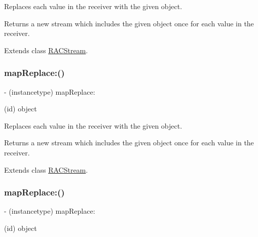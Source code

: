 Replaces each value in the receiver with the given object.

Returns a new stream which includes the given object once for each value in the receiver. 

Extends class \mbox{\hyperlink{interface_r_a_c_stream_a9e55da434f4cf84e14f9133ac48383b8}{R\+A\+C\+Stream}}.

\mbox{\label{category_r_a_c_stream_07_operations_08_a9e55da434f4cf84e14f9133ac48383b8}} 
\subsubsection{\texorpdfstring{map\+Replace\+:()}{mapReplace:()}\hspace{0.1cm}{\footnotesize\ttfamily [2/3]}}
{\footnotesize\ttfamily -\/ (instancetype) map\+Replace\+: \begin{DoxyParamCaption}\item[{(id)}]{object }\end{DoxyParamCaption}}

Replaces each value in the receiver with the given object.

Returns a new stream which includes the given object once for each value in the receiver. 

Extends class \mbox{\hyperlink{interface_r_a_c_stream_a9e55da434f4cf84e14f9133ac48383b8}{R\+A\+C\+Stream}}.

\mbox{\label{category_r_a_c_stream_07_operations_08_a9e55da434f4cf84e14f9133ac48383b8}} 
\subsubsection{\texorpdfstring{map\+Replace\+:()}{mapReplace:()}\hspace{0.1cm}{\footnotesize\ttfamily [3/3]}}
{\footnotesize\ttfamily -\/ (instancetype) map\+Replace\+: \begin{DoxyParamCaption}\item[{(id)}]{object }\end{DoxyParamCaption}}

